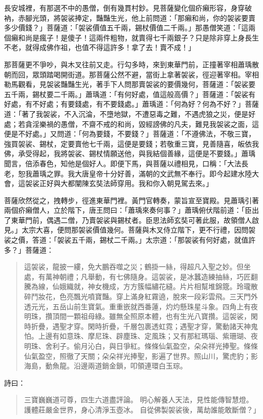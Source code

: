 長安城裡，有那選不中的愚僧，倒有幾貫村鈔。見菩薩變化個疥癩形容，身穿破衲，赤腳光頭，將袈裟捧定，豔豔生光，他上前問道：「那癩和尚，你的袈裟要賣多少價錢？」菩薩道：「袈裟價值五千兩，錫杖價值二千兩。」那愚僧笑道：「這兩個癩和尚是瘋子！是傻子！這兩件粗物，就賣得七千兩銀子？只是除非穿上身長生不老，就得成佛作祖，也值不得這許多！拿了去！賣不成！」

那菩薩更不爭吵，與木叉往前又走。行勾多時，來到東華門前，正撞著宰相蕭瑀散朝而回，眾頭踏喝開街道。那菩薩公然不避，當街上拿著袈裟，徑迎著宰相。宰相勒馬觀看，見袈裟豔豔生光，著手下人問那賣袈裟的要價幾何，菩薩道：「袈裟要五千兩，錫杖要二千兩。」蕭瑀道：「有何好處，值這般高價？」菩薩道：「袈裟有好處，有不好處；有要錢處，有不要錢處。」蕭瑀道：「何為好？何為不好？」菩薩道：「著了我袈裟，不入沉淪，不墮地獄，不遭惡毒之難，不遇虎狼之災，便是好處；若貪淫樂禍的愚僧，不齋不戒的和尚，毀經謗佛的凡夫，難見我袈裟之面，這便是不好處。」又問道：「何為要錢，不要錢？」菩薩道：「不遵佛法，不敬三寶，強買袈裟、錫杖，定要賣他七千兩，這便是要錢；若敬重三寶，見善隨喜，皈依我佛，承受得起，我將袈裟、錫杖情願送他，與我結個善緣，這便是不要錢。」蕭瑀聞言，倍添春色，知他是個好人。即便下馬，與菩薩以禮相見，口稱：「大法長老，恕我蕭瑀之罪。我大唐皇帝十分好善，滿朝的文武無不奉行。即今起建水陸大會，這袈裟正好與大都闡陳玄奘法師穿用。我和你入朝見駕去來。」

菩薩欣然從之，拽轉步，徑進東華門裡。黃門官轉奏，蒙旨宣至寶殿。見蕭瑀引著兩個疥癩僧人，立於階下，唐王問曰：「蕭瑀來奏何事？」蕭瑀俯伏階前道：「臣出了東華門前，偶遇二僧，乃賣袈裟與錫杖者。臣思法師玄奘可著此服，故領僧人啟見。」太宗大喜，便問那袈裟價值幾何。菩薩與木叉侍立階下，更不行禮，因問袈裟之價，答道：「袈裟五千兩，錫杖二千兩。」太宗道：「那袈裟有何好處，就值許多？」菩薩道：
\begin{quote}
這袈裟，龍披一縷，免大鵬吞噬之災；鶴掛一絲，得超凡入聖之妙。但坐處，有萬神朝禮；凡舉動，有七佛隨身。這袈裟，是冰蠶造練抽絲，巧匠翻騰為線，仙娥織就，神女機成，方方簇幅繡花縫。片片相幫堆錦簆。玲瓏散碎鬥妝花，色亮飄光噴寶豔。穿上滿身紅霧遶，脫來一段彩雲飛。三天門外透元光，五岳山前生寶氣。重重嵌就西番蓮，灼灼懸珠星斗象。四角上有夜明珠，攢頂間一顆祖母綠。雖無全照原本體，也有生光八寶攢。這袈裟，閑時折疊，遇聖才穿。閑時折疊，千層包裹透虹霓；遇聖才穿，驚動諸天神鬼怕。上邊有如意珠、摩尼珠、辟塵珠、定風珠；又有那紅瑪瑙、紫珊瑚、夜明珠、舍利子。偷月沁白，與日爭紅。條條仙氣盈空，朵朵祥光捧聖。條條仙氣盈空，照徹了天關；朵朵祥光捧聖，影遍了世界。照山川，驚虎豹；影海島，動魚龍。沿邊兩道銷金鎖，叩領連環白玉琮。
\end{quote}

詩曰：
\begin{quote}
三寶巍巍道可尊，四生六道盡評論。
明心解養人天法，見性能傳智慧燈。
護體莊嚴金世界，身心清淨玉壺冰。
自從佛製袈裟後，萬劫誰能敢斷僧？」
\end{quote}

